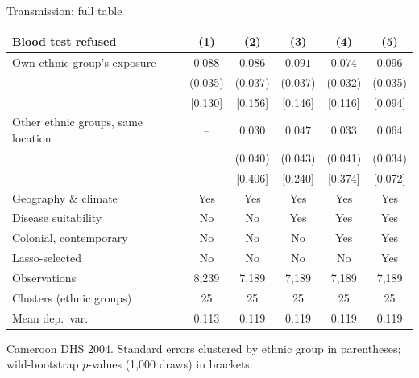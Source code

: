 \documentclass[aspectratio=1610]{beamer}
\newcommand{\returnbutton}[1]{\par\vfill\hfill\hyperlink{#1}{\beamerreturnbutton{Back}}}
\begin{document}
\begin{frame}[label=bk-transmission]{Transmission: full table}
  \centering
  \footnotesize
  \begin{tabular}{lccccc}
    \toprule
    Blood test refused & (1) & (2) & (3) & (4) & (5) \\
    \midrule
    Own ethnic group's exposure & $0.088$ & $0.086$ & $0.091$ & $0.074$ & $0.096$ \\
                                & (0.035) & (0.037) & (0.037) & (0.032) & (0.035) \\
                                & [0.130] & [0.156] & [0.146] & [0.116] & [0.094] \\
    Other ethnic groups, same location & -- & $0.030$ & $0.047$ & $0.033$ & $0.064$ \\
                                &         & (0.040) & (0.043) & (0.041) & (0.034) \\
                                &         & [0.406] & [0.240] & [0.374] & [0.072] \\
    \midrule
    Geography \& climate & Yes & Yes & Yes & Yes & Yes \\
    Disease suitability  & No  & No  & Yes & Yes & Yes \\
    Colonial, contemporary & No & No & No & Yes & Yes \\
    Lasso-selected       & No  & No  & No  & No  & Yes \\
    Observations & 8,239 & 7,189 & 7,189 & 7,189 & 7,189 \\
    Clusters (ethnic groups) & 25 & 25 & 25 & 25 & 25 \\
    Mean dep.\ var. & 0.113 & 0.119 & 0.119 & 0.119 & 0.119 \\
    \bottomrule
  \end{tabular}

  \vspace{0.4em}
  \raggedright\scriptsize
  Cameroon DHS 2004. Standard errors clustered by ethnic group in parentheses; wild-bootstrap
  $p$-values (1,000 draws) in brackets.
  \returnbutton{main-transmission}
\end{frame}
\end{document}
